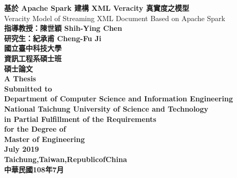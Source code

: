 \documentclass[12pt, a4paper]{article}
\begin{document}
\begin{center}
{\fontsize{16}{20} \textbf{基於 Apache Spark 建構 XML Veracity 真實度之模型}}\\
\vspace{14pt}
{\fontsize{16}{20} \textmd{Veracity Model of Streaming XML Document Based on Apache Spark}}\\
\vspace{14pt}
{\fontsize{16}{20} 
\textbf{指導教授：陳世穎 Shih-Ying Chen}\\
\vspace{10pt}
\hspace{12pt}\textbf{研究生：紀承甫 Cheng-Fu Ji}\\
}
\vspace{72pt}
{\fontsize{16}{20}
\textbf{國立臺中科技大學}\\
\vspace{5pt}
\textbf{資訊工程系碩士班}\\
\vspace{5pt}
\textbf{碩士論文}}\\
\vspace{48pt}
\textbf{{\fontsize{16}{20}
A Thesis\\\vspace{5pt}
Submitted to\\\vspace{5pt}
Department of Computer Science and Information Engineering\\\vspace{5pt}
National Taichung University of Science and Technology\\\vspace{5pt}
in Partial Fulfillment of the Requirements\\\vspace{5pt}
for the Degree of\\\vspace{5pt}
Master of Engineering\\
\vspace{60pt}
July 2019\\\vspace{8pt}
Taichung,\hspace{0.5em}Taiwan,\hspace{0.5em}Republic\hspace{0.5em}of\hspace{0.5em}China\\\vspace{10pt}
}}
{\fontsize{17}{21} \textbf{中華民國108年7月}}

\end{center}
\end{document}
